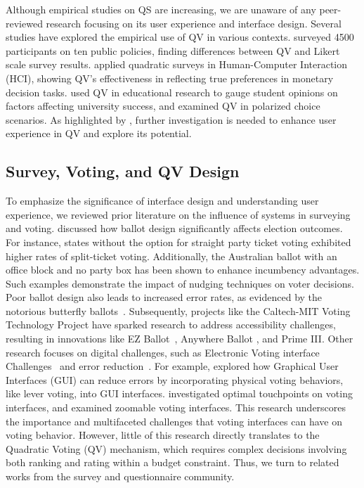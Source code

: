 Although empirical studies on QS are increasing, we are unaware of any peer-reviewed research focusing on its user experience and interface design. Several studies have explored the empirical use of QV in various contexts. \textcite{quarfoot2017quadratic} surveyed 4500 participants on ten public policies, finding differences between QV and Likert scale survey results. \textcite{chengCanShowWhat2021} applied quadratic surveys in Human-Computer Interaction (HCI), showing QV's effectiveness in reflecting true preferences in monetary decision tasks. \textcite{naylor2017first} used QV in educational research to gauge student opinions on factors affecting university success, and \textcite{cavailleWhoCaresMeasuring} examined QV in polarized choice scenarios. As highlighted by \textcite{quarfoot2017quadratic}, further investigation is needed to enhance user experience in QV and explore its potential.

\subsection{Survey, Voting, and QV Design}
To emphasize the significance of interface design and understanding user experience, we reviewed prior literature on the influence of systems in surveying and voting. \textcite{engstrom2020politics} discussed how ballot design significantly affects election outcomes. For instance, states without the option for straight party ticket voting exhibited higher rates of split-ticket voting. Additionally, the Australian ballot with an office block and no party box has been shown to enhance incumbency advantages. Such examples demonstrate the impact of nudging techniques on voter decisions. Poor ballot design also leads to increased error rates, as evidenced by the notorious butterfly ballots~\cite{wandButterflyDidIt2001}. Subsequently, projects like the Caltech-MIT Voting Technology Project have sparked research to address accessibility challenges, resulting in innovations like EZ Ballot~\cite{leeUniversalDesignBallot2016}, Anywhere Ballot \cite{summers2014making}, and Prime III\cite{dawkinsPrimeIIIInnovative2009}. Other research focuses on digital challenges, such as Electronic Voting interface Challenges~\cite{herrnsonEVALUATIONMARYLANDNEW2003} and error reduction~\cite{everettElectronicVotingMachines2008a}. For example, \textcite{everettElectronicVotingMachines2008a} explored how Graphical User Interfaces (GUI) can reduce errors by incorporating physical voting behaviors, like lever voting, into GUI interfaces. \textcite{gilbertAnomalyDetectionElectronic2013} investigated optimal touchpoints on voting interfaces, and \textcite{conradElectronicVotingEliminates2009} examined zoomable voting interfaces. This research underscores the importance and multifaceted challenges that voting interfaces can have on voting behavior. However, little of this research directly translates to the Quadratic Voting (QV) mechanism, which requires complex decisions involving both ranking and rating within a budget constraint. Thus, we turn to related works from the survey and questionnaire community.

